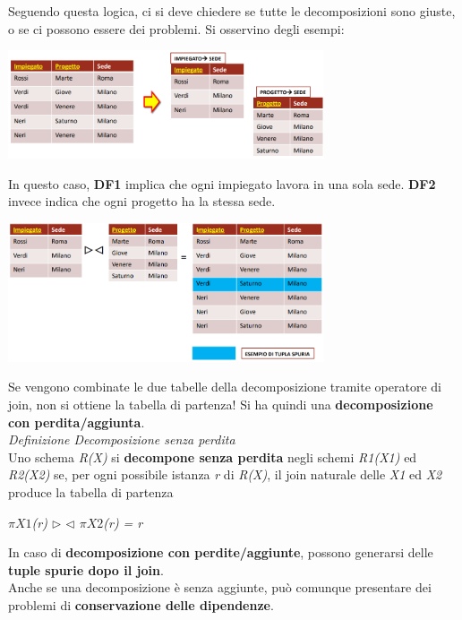 \documentclass{article}
\begin{document}
Seguendo questa logica, ci si deve chiedere se tutte le decomposizioni sono giuste, o se ci possono essere dei problemi. Si osservino degli esempi:
\begin{center}
    \includegraphics[width=0.7\textwidth]{foto7.png}
\end{center}
In questo caso, \textbf{DF1} implica che ogni impiegato lavora in una sola sede. \textbf{DF2} invece indica che ogni progetto ha la stessa sede.
\begin{center}
    \includegraphics[width=0.7\textwidth]{foto8.png}
\end{center}
Se vengono combinate le due tabelle della decomposizione tramite operatore di join, non si ottiene la tabella di partenza! Si ha quindi una \textbf{decomposizione con perdita/aggiunta}.\vspace{14pt}\\
\textit{Definizione Decomposizione senza perdita}\\
Uno schema \textit{R(X)} si \textbf{decompone senza perdita} negli schemi \textit{R1(X1)} ed \textit{R2(X2)} se, per ogni possibile istanza \textit{r} di \textit{R(X)}, il join naturale delle \textit{X1} ed \textit{X2} produce la tabella di partenza
\begin{center}
    \textit{$\pi X1$(r) $\triangleright$ $\triangleleft$ $\pi X2$(r) = r}\\
\end{center}
In caso di \textbf{decomposizione con perdite/aggiunte}, possono generarsi delle \textbf{tuple spurie dopo il join}.\vspace{14pt}\\
Anche se una decomposizione è senza aggiunte, può comunque presentare dei problemi di \textbf{conservazione delle dipendenze}.\vspace{14pt}\\
\end{document}

